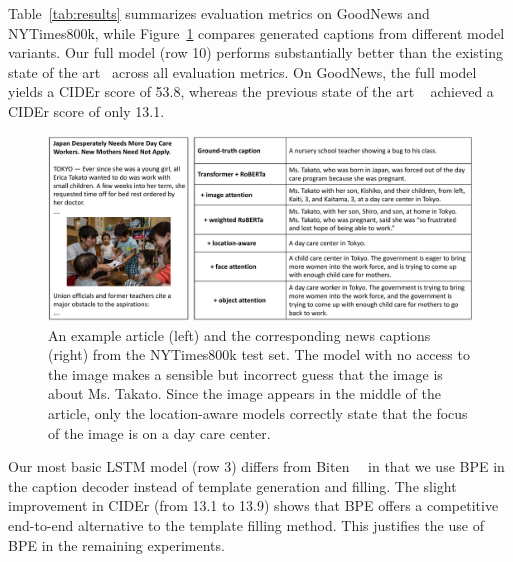 Table~\ref{tab:results} summarizes evaluation metrics on GoodNews and
NYTimes800k, while Figure~\ref{fig:example} compares generated captions from
different model variants. Our full model (row 10) performs substantially better
than the existing state of the art~\cite{Biten2019GoodNews} across all
evaluation metrics. On GoodNews, the full model yields a CIDEr score of 53.8,
whereas the previous state of the art ~\cite{Biten2019GoodNews} achieved a
CIDEr score of only 13.1.

\begin{figure}[t]
	\begin{center}
		\includegraphics[width=\linewidth]{figures/childcare.pdf}
	\end{center}
	\capmoveup
	\caption{An example article (left) and the corresponding news captions
		(right) from the NYTimes800k test set. The model with no access to the
		image makes a sensible but incorrect guess that the image is about Ms.
		Takato. Since the image appears in the middle of the article, only the
		location-aware models correctly state that the focus of the image is on
		a day care center.}
	\label{fig:example}
	\smallfigmoveup
\end{figure}


Our most basic LSTM model (row 3) differs from
Biten~\etal~\cite{Biten2019GoodNews} in that we use BPE in the caption decoder
instead of template generation and filling. The slight improvement in CIDEr
(from 13.1 to 13.9) shows that BPE offers a competitive end-to-end alternative
to the template filling method. This justifies the use of BPE in the remaining
experiments.


